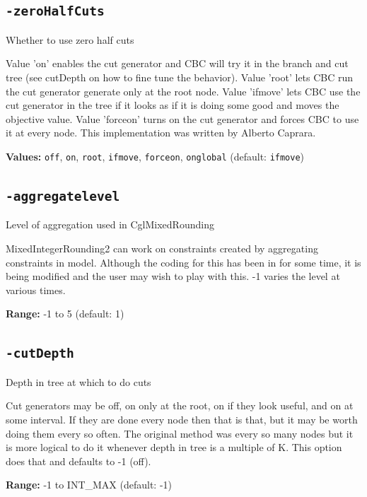 \documentclass[11pt,a4paper]{article}
\begin{document}
\subsection*{\texttt{-zeroHalfCuts}}

Whether to use zero half cuts

Value 'on' enables the cut generator and CBC will try it in the branch and cut tree (see cutDepth on how to fine tune the behavior). Value 'root' lets CBC run the cut generator generate only at the root node. Value 'ifmove' lets CBC use the cut generator in the tree if it looks as if it is doing some good and moves the objective value. Value 'forceon' turns on the cut generator and forces CBC to use it at every node.
 This implementation was written by Alberto Caprara.

\textbf{Values:} \texttt{off}, \texttt{on}, \texttt{root}, \texttt{ifmove}, \texttt{forceon}, \texttt{onglobal} (default: \texttt{ifmove})

\subsection*{\texttt{-aggregatelevel}}

Level of aggregation used in CglMixedRounding

MixedIntegerRounding2 can work on constraints created by aggregating constraints in model.  Although the coding for this has been in for some time, it is being modified and the user may wish to play with this. -1 varies the level at various times.

\textbf{Range:} -1 to 5 (default: 1)

\subsection*{\texttt{-cutDepth}}

Depth in tree at which to do cuts

Cut generators may be off, on only at the root, on if they look useful, and on at some interval.  If they are done every node then that is that, but it may be worth doing them every so often.  The original method was every so many nodes but it is more logical to do it whenever depth in tree is a multiple of K.  This option does that and defaults to -1 (off).

\textbf{Range:} -1 to INT\_MAX (default: -1)
\end{document}

